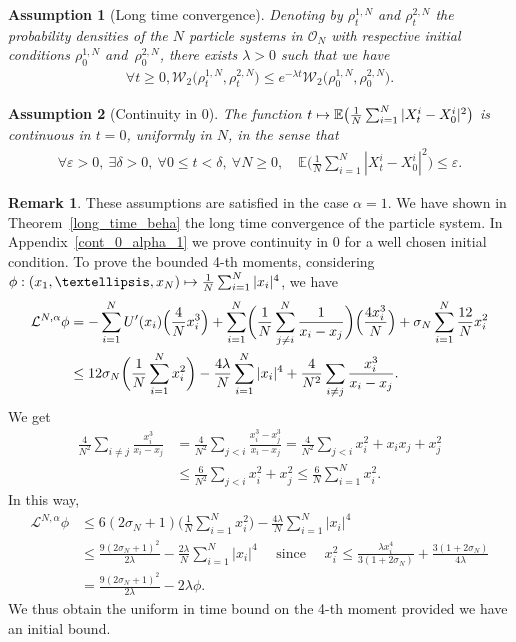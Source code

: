 \documentclass[11pt]{article}
\newcommand\mto{\mathchoice{\longmapsto}{\mapsto}{\mapsto}{\mapsto}}
\let\epsilon\varepsilon
\theoremstyle{plain}
\newtheorem{assumption}{Assumption}
\theoremstyle{definition}
\newtheorem{remark}{Remark}[section]
\begin{document}
\begin{assumption}[Long time convergence]\label{Hyp_long_time_cv}
Denoting by $\rho^{1,N}_t$ and $\rho^{2,N}_t$ the probability densities of the $N$ particle systems in $\mathcal{O}_N$ with respective initial conditions $\rho^{1,N}_0$ and~$\rho^{2,N}_0$, there exists $\lambda>0$ such that we have
\begin{align*}
\forall t\geq0, \mathcal{W}_2\bigl(\rho^{1,N}_t,\rho^{2,N}_t\bigr)\leq e^{-\lambda t}\mathcal{W}_2\bigl(\rho^{1,N}_0,\rho^{2,N}_0\bigr).
\end{align*}
\end{assumption}

\begin{assumption}[Continuity in 0]\label{Hyp_cont}
The function $t\mto\mathbb{E}\bigl(\frac{1}{N}\sum_{i=1}^N|X^i_t-X^i_0|^2\bigr)$ is continuous in $t=0$, uniformly in $N$, in the sense that
\begin{align*}
\forall \epsilon>0,\ \exists \delta>0,\ \forall 0\leq t<\delta,\ \forall N\geq0,\quad \mathbb{E}\biggl(\frac{1}{N}\sum_{i=1}^N|X^i_t-X^i_0|^2\biggr)\leq\epsilon.
\end{align*}
\end{assumption}

\begin{remark}
These assumptions are satisfied in the case $\alpha=1$. We have shown in Theorem~\ref{long_time_beha} the long time convergence of the particle system. In Appendix~\ref{cont_0_alpha_1} we prove continuity in 0 for a well chosen initial condition. To prove the bounded 4-th moments, considering $\phi:(x_1,\dots,x_N)\mto \frac{1}{N}\sum_{i=1}^N|x_i|^4$, we have
\begin{align*}
\mathcal{L}^{N,\alpha}\phi&=-\sum_{i=1}^NU'(x_i)\Bigl(\frac{4}{N}x_i^3\Bigr)+\sum_{i=1}^N\biggl(\frac{1}{N}\sum_{j\neq i}^N\frac{1}{x_i-x_j}\biggr)\Bigl(\frac{4x_i^3}{N}\Bigr)+\sigma_N\sum_{i=1}^N \frac{12}{N}x_i^2\\
&\leq 12\sigma_N\biggl(\frac{1}{N}\sum_{i=1}^N x_i^2\biggr)-\frac{4\lambda}{N}\sum_{i=1}^N|x_i|^4+\frac{4}{N^2}\sum_{i\neq j}\frac{x_i^3}{x_i-x_j}.
\end{align*}
We get
\begin{align*}
\frac{4}{N^2}\sum_{i\neq j}\frac{x_i^3}{x_i-x_j}&=\frac{4}{N^2}\sum_{j< i}\frac{x_i^3-x_j^3}{x_i-x_j}=\frac{4}{N^2}\sum_{j< i}x_i^2+x_ix_j+x_j^2\\
&\leq\frac{6}{N^2}\sum_{j< i}x_i^2+x_j^2\leq\frac{6}{N}\sum_{i=1}^Nx_i^2.
\end{align*}
In this way,
\begin{align*}
\mathcal{L}^{N,\alpha}\phi&\leq 6\left(2\sigma_N+1\right)\biggl(\frac{1}{N}\sum_{i=1}^N x_i^2\biggr)-\frac{4\lambda}{N}\sum_{i=1}^N|x_i|^4\\
&\leq \frac{9\left(2\sigma_N+1\right)^2}{2\lambda}-\frac{2\lambda}{N}\sum_{i=1}^N|x_i|^4\quad \text{ since }\quad x_i^2\leq \frac{\lambda x_i^4}{3(1+2\sigma_N)}+\frac{3(1+2\sigma_N)}{4\lambda }\\
&=\frac{9\left(2\sigma_N+1\right)^2}{2\lambda}-2\lambda\phi.
\end{align*}
We thus obtain the uniform in time bound on the 4-th moment provided we have an initial bound.
\end{remark}
\end{document}
